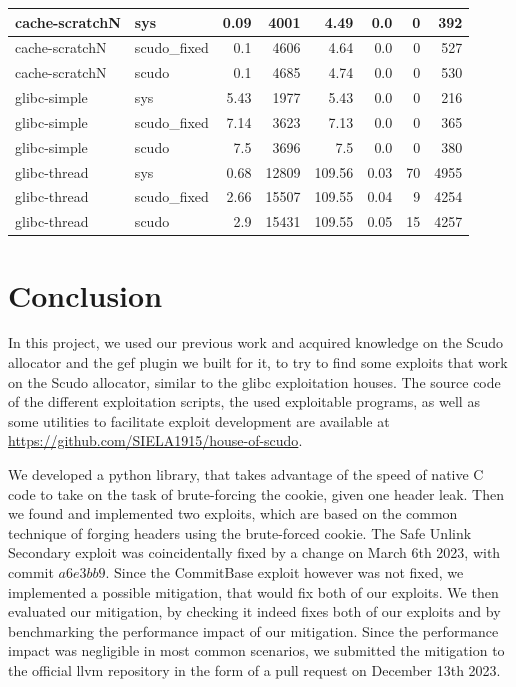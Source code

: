 \documentclass[a4paper,11pt,oneside]{report}
\begin{document}
\begin{longtable}[h]{l l r r r r r r}
  \midrule
  cache-scratchN & sys & 0.09 & 4001 & 4.49 & 0.0 & 0 & 392 \\
  \midrule
  cache-scratchN & scudo\_fixed & 0.1 & 4606 & 4.64 & 0.0 & 0 & 527 \\
  \midrule
  cache-scratchN & scudo & 0.1 & 4685 & 4.74 & 0.0 & 0 & 530 \\
  \midrule
  glibc-simple & sys & 5.43 & 1977 & 5.43 & 0.0 & 0 & 216 \\
  \midrule
  glibc-simple & scudo\_fixed & 7.14 & 3623 & 7.13 & 0.0 & 0 & 365 \\
  \midrule
  glibc-simple & scudo & 7.5 & 3696 & 7.5 & 0.0 & 0 & 380 \\
  \midrule
  glibc-thread & sys & 0.68 & 12809 & 109.56 & 0.03 & 70 & 4955 \\
  \midrule
  glibc-thread & scudo\_fixed & 2.66 & 15507 & 109.55 & 0.04 & 9 & 4254 \\
  \midrule
  glibc-thread & scudo & 2.9 & 15431 & 109.55 & 0.05 & 15 & 4257 \\
  \bottomrule
\end{longtable}


\chapter{Conclusion}

In this project, we used our previous work and acquired knowledge on the Scudo allocator
and the gef plugin we built for it, to try to find some exploits that work on the Scudo
allocator, similar to the glibc exploitation houses. The source code of the different
exploitation scripts, the used exploitable programs, as well as some utilities to
facilitate exploit development are available at
\url{https://github.com/SIELA1915/house-of-scudo}.

We developed a python library, that takes advantage of the speed of native C code to take
on the task of brute-forcing the cookie, given one header leak. Then we found and
implemented two exploits, which are based on the common technique of forging headers using
the brute-forced cookie.
The Safe Unlink Secondary exploit was coincidentally fixed by a change on March 6th 2023,
with commit $a6e3bb9$. Since the CommitBase exploit however was not fixed, we implemented
a possible mitigation, that would fix both of our exploits. We then evaluated our
mitigation, by checking it indeed fixes both of our exploits and by benchmarking the
performance impact of our mitigation. Since the performance impact was negligible in most
common scenarios, we submitted the mitigation to the official llvm repository in the form
of a pull request on December 13th 2023.


\cleardoublepage{}
\printbibliography{}
\end{document}
